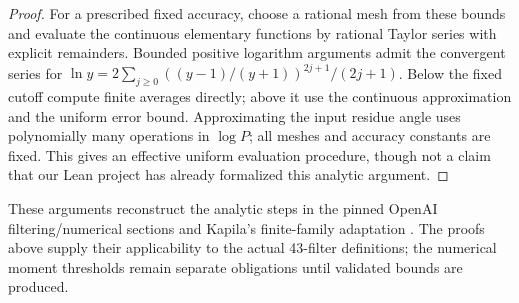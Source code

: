\begin{proof}
For a prescribed fixed accuracy, choose a rational mesh from these
bounds and evaluate the continuous elementary functions by rational
Taylor series with explicit remainders. Bounded positive logarithm
arguments admit the convergent series for
$\ln y=2\sum_{j\ge0}((y-1)/(y+1))^{2j+1}/(2j+1)$.
Below the fixed cutoff compute finite averages directly; above it use
the continuous approximation and the uniform error bound. Approximating
the input residue angle uses polynomially many operations in $\log P$;
all meshes and accuracy constants are fixed. This gives an effective
uniform evaluation procedure, though not a claim that our Lean project
has already formalized this analytic argument.
\end{proof}

These arguments reconstruct the analytic steps in the pinned OpenAI
filtering/numerical sections and Kapila's finite-family adaptation
\cite{openai,kapila}. The proofs above supply their applicability to the
actual 43-filter definitions; the numerical moment thresholds remain
separate obligations until validated bounds are produced.
